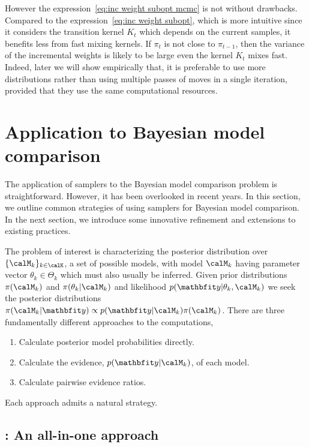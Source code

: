 However the expression~\eqref{eq:inc weight subopt mcmc} is not without
drawbacks. Compared to the expression~\eqref{eq:inc weight subopt}, which is
more intuitive since it considers the transition kernel $K_t$ which depends on
the current samples, it benefits less from fast mixing kernels. If $\pi_t$ is
not close to $\pi_{t-1}$, then the variance of the incremental weights is
likely to be large even the kernel $K_t$ mixes fast. Indeed, later we will
show empirically that, it is preferable to use more distributions rather than
using multiple passes of \mcmc moves in a single iteration, provided that they
use the same computational resources.

\section{Application to Bayesian model comparison}
\label{sec:Application to Bayesian model comparison}

The application of \smc samplers to the Bayesian model comparison problem is
straightforward. However, it has been overlooked in recent years. In this
section, we outline common strategies of using \smc samplers for Bayesian
model comparison. In the next section, we introduce some innovative refinement
and extensions to existing practices.

The problem of interest is characterizing the posterior distribution over
$\{\calM_k\}_{k\in\calK}$, a set of possible models, with model $\calM_k$
having parameter vector $\theta_k\in\Theta_k$ which must also usually be
inferred. Given prior distributions $\pi(\calM_k)$ and $\pi(\theta_k|\calM_k)$
and likelihood $p(\data|\theta_k,\calM_k)$ we seek the posterior distributions
$\pi(\calM_k|\data) \propto p(\data|\calM_k)\pi(\calM_k)$. There are three
fundamentally different approaches to the computations,
\begin{enumerate}
  \item Calculate posterior model probabilities directly.
  \item Calculate the evidence, $p(\data|\calM_k)$, of each model.
  \item Calculate pairwise evidence ratios.
\end{enumerate}
Each approach admits a natural \smc strategy.

\subsection{\smc[1]: An all-in-one approach}
\label{sub:smc1: An all-in-one approach}

